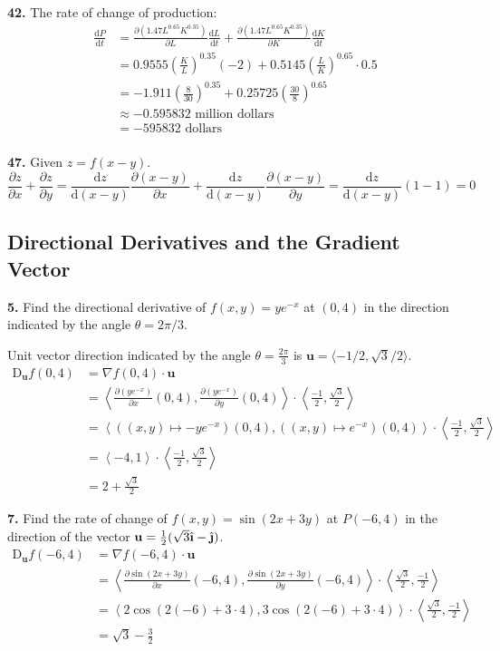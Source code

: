 \documentclass[a4paper,12pt]{article}
\newcommand{\unit}[1]{\hat{\textbf #1}}
\newcommand{\tho}[3][]{\frac{\partial #1 #2}{\partial #3 #1}}
\newcommand{\leibniz}[3][]{\frac{\mathrm{d} #1 #2}{\mathrm{d} #3 #1}}
\newcommand{\exercise}[1]{\noindent\textbf{#1.}}
\begin{document}
\exercise{42} The rate of change of production:
\begin{align*}
\leibniz{P}{t} &= \tho{\left(1.47L^{0.65}K^{0.35}\right)}{L}\leibniz{L}{t}
                + \tho{\left(1.47L^{0.65}K^{0.35}\right)}{K}\leibniz{K}{t}\\
               &= 0.9555\left(\frac{K}{L}\right)^{0.35} (-2)
                + 0.5145\left(\frac{L}{K}\right)^{0.65} \cdot 0.5\\
               &= -1.911\left(\frac{8}{30}\right)^{0.35}
                + 0.25725\left(\frac{30}{8}\right)^{0.65}\\
               &\approx -0.595832\text{ million dollars}\\
               &= -595832\text{ dollars}\\
\end{align*}

\exercise{47} Given $z = f(x - y)$.
\[\tho{z}{x} + \tho{z}{y}
= \leibniz{z}{(x - y)}\tho{(x - y)}{x} + \leibniz{z}{(x - y)}\tho{(x - y)}{y}
= \leibniz{z}{(x - y)}(1 - 1)
= 0\]

\subsection{Directional Derivatives and the Gradient Vector}
\exercise{5} Find the directional derivative of $f(x, y) = ye^{-x}$ at $(0, 4)$
in the direction indicated by the angle $\theta = 2\pi/3$.

Unit vector direction indicated by the angle $\theta = \frac{2\pi}{3}$
is $\mathbf{u} = \langle -1/2, \sqrt{3}/2 \rangle$.
\begin{align*}
  \mathrm{D}_\mathbf{u}f(0, 4)
&= \nabla f(0, 4)\cdot\mathbf{u}\\
&= \left<\tho{\left(ye^{-x}\right)}{x}(0, 4),
         \tho{\left(ye^{-x}\right)}{y}(0, 4)\right>
   \cdot \left<\frac{-1}{2}, \frac{\sqrt 3}{2}\right>\\
&= \left<\left((x, y) \mapsto -ye^{-x}\right)(0, 4),
         \left((x, y) \mapsto e^{-x}\right)(0, 4)\right>
   \cdot \left<\frac{-1}{2}, \frac{\sqrt 3}{2}\right>\\
&= \left<-4, 1\right> \cdot \left<\frac{-1}{2}, \frac{\sqrt 3}{2}\right>\\
&= 2 + \frac{\sqrt 3}{2}
\end{align*}

\exercise{7} Find the rate of change of $f(x, y) = \sin(2x + 3y)$ at $P(-6, 4)$
in the direction of the vector $\mathbf{u} = \frac{1}{2}(\sqrt{3}\unit\i - \unit\j)$.
\begin{align*}
  \mathrm{D}_\mathbf{u}f(-6, 4)
&= \nabla f(-6, 4)\cdot\mathbf{u}\\
&= \left<\tho{\sin(2x + 3y)}{x}(-6, 4),
         \tho{\sin(2x + 3y)}{y}(-6, 4)\right>
   \cdot \left<\frac{\sqrt 3}{2}, \frac{-1}{2}\right>\\
&= \left<2\cos(2(-6) + 3 \cdot 4),
         3\cos(2(-6) + 3 \cdot 4)\right>
   \cdot \left<\frac{\sqrt 3}{2}, \frac{-1}{2}\right>\\
&= \sqrt 3 - \frac{3}{2}
\end{align*}
\pagebreak
\end{document}
